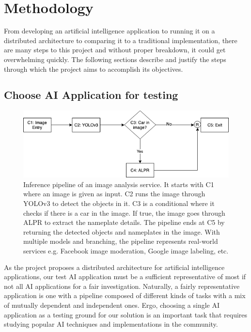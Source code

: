 \documentclass{report}
\begin{document}
\chapter{Methodology}\label{chap:methodology}

From developing an artificial intelligence application to running it on a distributed architecture to comparing it to a traditional implementation, there are many steps to this project and without proper breakdown, it could get overwhelming quickly.
The following sections describe and justify the steps through which the project aims to accomplish its objectives.

\section{Choose AI Application for testing}

\begin{figure}[h!]
  \includegraphics[width=\textwidth]{CurrentImageService.png}
  \caption{Inference pipeline of an image analysis service. It starts with C1 where an image is given as input. C2 runs the image through YOLOv3 \cite{YOLOv3} to detect the objects in it. C3 is a conditional where it checks if there is a car in the image. If true, the image goes through ALPR \cite{OpenALPR} to extract the nameplate details. The pipeline ends at C5 by returning the detected objects and nameplates in the image. With multiple models and branching, the pipeline represents real-world services e.g. Facebook image moderation, Google image labeling, etc.}
  \label{fig:CurrentImageService}
\end{figure}

As the project proposes a distributed architecture for artificial intelligence applications, our test AI application must be a sufficient representative of most if not all AI applications for a fair investigation.
Naturally, a fairly representative application is one with a pipeline composed of different kinds of tasks with a mix of mutually dependent and independent ones.
Ergo, choosing a single AI application as a testing ground for our solution is an important task that requires studying popular AI techniques and implementations in the community.
\end{document}
